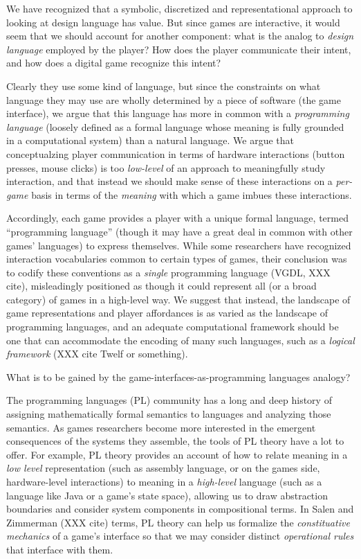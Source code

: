 \documentclass[sigconf]{acmart}
\begin{document}
We have recognized that a symbolic, discretized and representational
approach to looking at design language has value. But since games are
interactive, it would seem that we should account for another component:
what is the analog to {\em design language} employed by the player? How
does the player communicate their intent, and how does a digital game
recognize this intent?

Clearly they use some kind of language, but since the constraints on what
language they may use are wholly determined by a piece of software (the
game interface), we argue that this language has more in common with a {\em
programming language} (loosely defined as a formal language whose meaning
is fully grounded in a computational system) than a natural language. We
argue that conceptualzing player communication in terms of hardware
interactions (button presses, mouse clicks) is too {\em low-level} of an
approach to meaningfully study interaction, and that instead we should make
sense of these interactions on a {\em per-game} basis in terms of the {\em
meaning} with which a game imbues these interactions. 

Accordingly, each game provides a player with a unique formal language,
termed ``programming language'' (though it may have a great deal in common
with other games' languages) to express themselves. While some researchers
have recognized interaction vocabularies common to certain types of games,
their conclusion was to codify these conventions as a {\em single}
programming language (VGDL, XXX cite), misleadingly positioned as though it
could represent all (or a broad category) of games in a high-level way.
We suggest that instead, the landscape of game representations and player
affordances is as varied as the landscape of programming languages, and an
adequate computational framework should be one that can accommodate the
encoding of many such languages, such as a {\em logical framework} (XXX
cite Twelf or something).

What is to be gained by the game-interfaces-as-programming languages analogy?

The programming languages (PL) community has a long and deep history of
assigning mathematically formal semantics to languages and analyzing those
semantics. As games researchers become more interested in the emergent
consequences of the systems they assemble, the tools of PL theory have a
lot to offer. For example, PL theory provides an account of how to relate
meaning in a {\em low level} representation (such as assembly language, or
on the games side, hardware-level interactions) to meaning in a {\em
high-level} language (such as a language like Java or a game's state
space), allowing us to draw abstraction boundaries and consider system
components in compositional terms. In Salen and Zimmerman (XXX cite) terms,
PL theory can help us formalize the {\em constituative mechanics} of a
game's interface so that we may consider distinct {\em operational rules} 
that interface with them. 
\end{document}
